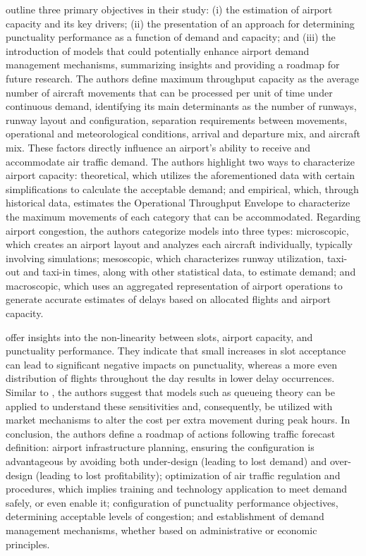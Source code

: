  outline three primary objectives in their study: (i) the estimation of airport capacity and its key drivers; (ii) the presentation of an approach for determining punctuality performance as a function of demand and capacity; and (iii) the introduction of models that could potentially enhance airport demand management mechanisms, summarizing insights and providing a roadmap for future research. The authors define maximum throughput capacity as the average number of aircraft movements that can be processed per unit of time under continuous demand, identifying its main determinants as the number of runways, runway layout and configuration, separation requirements between movements, operational and meteorological conditions, arrival and departure mix, and aircraft mix. These factors directly influence an airport's ability to receive and accommodate air traffic demand. The authors highlight two ways to characterize airport capacity: theoretical, which utilizes the aforementioned data with certain simplifications to calculate the acceptable demand; and empirical, which, through historical data, estimates the Operational Throughput Envelope to characterize the maximum movements of each category that can be accommodated. Regarding airport congestion, the authors categorize models into three types: microscopic, which creates an airport layout and analyzes each aircraft individually, typically involving simulations; mesoscopic, which characterizes runway utilization, taxi-out and taxi-in times, along with other statistical data, to estimate demand; and macroscopic, which uses an aggregated representation of airport operations to generate accurate estimates of delays based on allocated flights and airport capacity. 

 offer insights into the non-linearity between slots, airport capacity, and punctuality performance. They indicate that small increases in slot acceptance can lead to significant negative impacts on punctuality, whereas a more even distribution of flights throughout the day results in lower delay occurrences. Similar to , the authors suggest that models such as queueing theory can be applied to understand these sensitivities and, consequently, be utilized with market mechanisms to alter the cost per extra movement during peak hours. In conclusion, the authors define a roadmap of actions following traffic forecast definition: airport infrastructure planning, ensuring the configuration is advantageous by avoiding both under-design (leading to lost demand) and over-design (leading to lost profitability); optimization of air traffic regulation and procedures, which implies training and technology application to meet demand safely, or even enable it; configuration of punctuality performance objectives, determining acceptable levels of congestion; and establishment of demand management mechanisms, whether based on administrative or economic principles.

